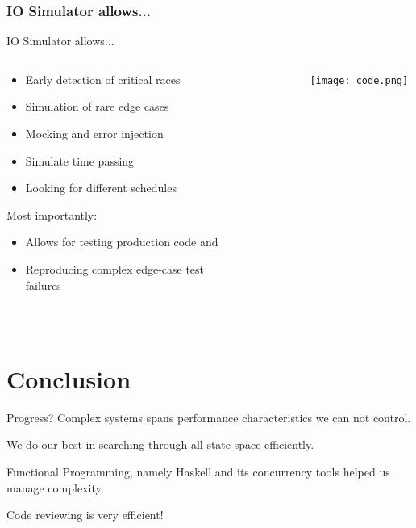 \documentclass{beamer}
\begin{document}
\subsubsection*{IO Simulator allows...}
\begin{frame}{IO Simulator allows...}
  \begin{columns}
    \begin{column}{0.4\textwidth}
      \begin{itemize}
        \item Early detection of critical races
        \item Simulation of rare \alert{edge cases}
        \item Mocking and \alert{error injection}
        \item Simulate time passing
        \item Looking for \alert{different schedules}
      \end{itemize}
      Most importantly:
      \begin{itemize}
        \item Allows for testing \alert{production code} and
        \item \alert{Reproducing} complex edge-case test failures
      \end{itemize}
    
    \end{column}
    \begin{column}{0.6\textwidth}
      \texttt{[image: code.png]}
    \end{column}
  \end{columns}
\end{frame}

\section{Conclusion}

\begin{frame}{Progress?}
  Complex systems spans performance characteristics we can not control.

  We do our best in searching through all state space efficiently.

  Functional Programming, namely Haskell and its concurrency tools helped us manage
  complexity.

  Code reviewing is very efficient!
\end{frame}
\end{document}
